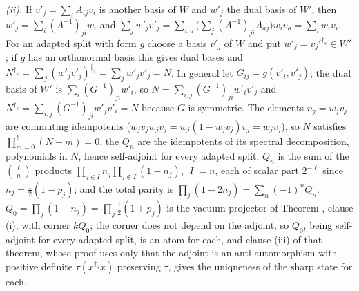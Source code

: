 \emph{(ii).} If $v'_{j} = \sum_{i}A_{ij}v_{i}$ is another basis of $W$ and $w'_{j}$ the dual basis of $W'$, then $w'_{j} = \sum_{i}(A^{-1})_{ji}w_{i}$ and $\sum_{j}w'_{j}v'_{j} = \sum_{i,a}\bigl(\sum_{j}(A^{-1})_{ji}A_{aj}\bigr)w_{i}v_{a} = \sum_{i}w_{i}v_{i}$. For an adapted split with form $g$ choose a basis $v'_{j}$ of $W$ and put $w'_{j} = v_{j}'^{\dagger_{s}} \in W'$; if $g$ has an orthonormal basis this gives dual bases and $N^{\dagger_{s}} = \sum_{j}(w'_{j}v'_{j})^{\dagger_{s}} = \sum_{j}w'_{j}v'_{j} = N$. In general let $G_{ij} = g(v'_{i},v'_{j})$; the dual basis of $W'$ is $\sum_{i}(G^{-1})_{ji}w'_{i}$, so $N = \sum_{i,j}(G^{-1})_{ji}w'_{i}v'_{j}$ and $N^{\dagger_{s}} = \sum_{i,j}(G^{-1})_{ji}w'_{j}v'_{i} = N$ because $G$ is symmetric. The elements $n_{j} = w_{j}v_{j}$ are commuting idempotents ($w_{j}v_{j}w_{j}v_{j} = w_{j}(1 - w_{j}v_{j})v_{j} = w_{j}v_{j}$), so $N$ satisfies $\prod_{m=0}^{\ell}(N - m) = 0$, the $Q_{n}$ are the idempotents of its spectral decomposition, polynomials in $N$, hence self-adjoint for every adapted split; $Q_{n}$ is the sum of the $\binom{\ell}{n}$ products $\prod_{j \in I}n_{j}\prod_{j \notin I}(1 - n_{j})$, $|I| = n$, each of scalar part $2^{-\ell}$ since $n_{j} = \tfrac12(1 - p_{j})$; and the total parity is $\prod_{j}(1 - 2n_{j}) = \sum_{n}(-1)^{n}Q_{n}$. $Q_{0} = \prod_{j}(1 - n_{j}) = \prod_{j}\tfrac12(1 + p_{j})$ is the vacuum projector of Theorem , clause (i), with corner $kQ_{0}$; the corner does not depend on the adjoint, so $Q_{0}$, being self-adjoint for every adapted split, is an atom for each, and clause (iii) of that theorem, whose proof uses only that the adjoint is an anti-automorphism with positive definite $\tau(x^{\dagger_{s}}x)$ preserving $\tau$, gives the uniqueness of the sharp state for each.


